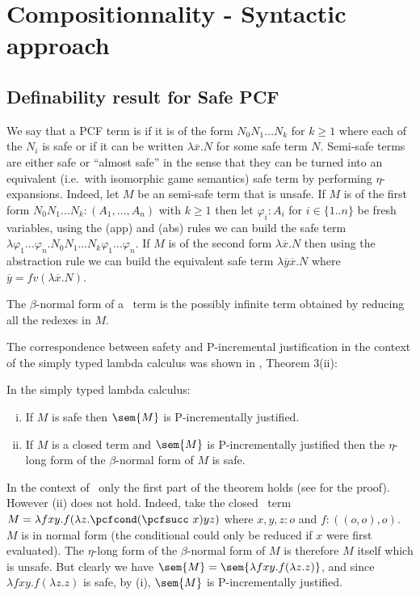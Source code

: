 \section{Compositionnality - Syntactic approach}

\subsection{Definability result for Safe PCF}

We say that a PCF term is  if it is of the form $N_0 N_1 \ldots N_k$ for $k\geq 1$ where each of the $N_i$ is safe or if it can be written $\lambda \overline{x} . N$ for some safe term $N$. Semi-safe terms are either safe or ``almost safe'' in the sense that they can be turned into an equivalent (i.e.~with isomorphic game semantics) safe term  by performing $\eta$-expansions. Indeed, let $M$ be an semi-safe term that is unsafe.
If $M$ is of the first form $N_0 N_1 \ldots N_k : (A_1,\ldots,A_n)$ with $k\geq 1$ then let $\varphi_i:A_i$ for $i\in\{1..n\}$ be fresh variables, using the (app) and (abs) rules we can build the safe term $\lambda \varphi_1 \ldots \varphi_n . N_0 N_1 \ldots N_k \varphi_1 \ldots \varphi_n$. If $M$ is of the second form $\lambda \overline{x} . N$ then using the abstraction rule we can build the equivalent safe term $\lambda \overline{y} \overline{x}. N$  where $\overline{y} = fv(\lambda \overline{x}. N)$.

The $\beta$-normal form of a \pcf\ term is the possibly infinite term obtained by reducing all the redexes in $M$.

The correspondence between safety and P-incremental justification in the context of the simply typed lambda calculus was shown
in \cite{blumong:safelambdacalculus}, Theorem 3(ii):

\begin{theorem}
\label{thm:safeincrejust} In the simply typed lambda calculus:
\begin{enumerate}[(i)]
\item If $M$ is safe then $\sem{M}$ is P-incrementally justified.
\item If $M$ is a closed term and $\sem{M}$ is
  P-incrementally justified then the $\eta$-long form of the
  $\beta$-normal form of $M$ is safe.
\end{enumerate}
\end{theorem}

In the context of \pcf\, only the first part of the theorem holds (see \cite{blumtransfer} for the proof). However (ii) does not hold. Indeed, take the closed \pcf\ term $M = \lambda f x y. f (\lambda z. \pcfcond (\pcfsucc\ x) y z )$ where $x,y,z:o$ and $f:((o,o),o)$. $M$ is in normal form (the conditional  could  only be reduced if $x$ were first evaluated). The $\eta$-long form of the $\beta$-normal form of $M$ is therefore $M$ itself which is unsafe.
But clearly we have $\sem{M} = \sem{\lambda f x y. f (\lambda z. z)}$, and since  $\lambda f x y. f (\lambda z. z)$ is safe, by (i), $\sem{M}$ is P-incrementally justified.

